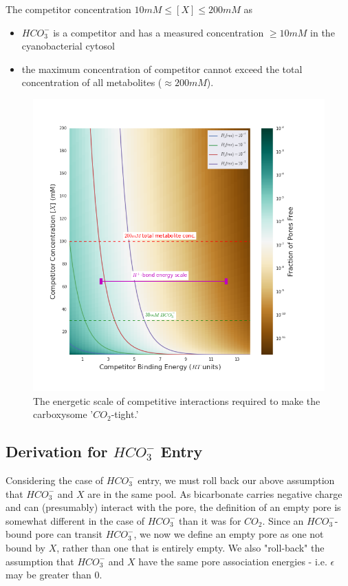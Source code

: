 \documentclass[10pt,a4paper]{article}
\begin{document}
The competitor concentration $10 mM \le [X] \le 200 mM$ as
\begin{itemize}
\item $HCO_3^-$ is a competitor and has a measured concentration $\ge 10 mM$ in the cyanobacterial cytosol
\item the maximum concentration of competitor cannot exceed the total concentration of all metabolites ($\approx 200 mM$).
\end{itemize}


\begin{figure}[ht]
\centering
\includegraphics[scale=0.6]{figures/competitive_pore_energy_v_conc.png} 
\caption{The energetic scale of competitive interactions required to make the carboxysome '$CO_2$-tight.'}
\label{fig1}
\end{figure}

\subsection{Derivation for $HCO_3^-$ Entry}

Considering the case of $HCO_3^-$ entry, we must roll back our above assumption that $HCO_3^-$ and $X$ are in the same pool. As bicarbonate carries negative charge and can (presumably) interact with the pore, the definition of an empty pore is somewhat different in the case of $HCO_3^-$ than it was for $CO_2$. Since an $HCO_3^-$-bound pore can transit $HCO_3^-$, we now we define an empty pore as one not bound by $X$, rather than one that is entirely empty. We also "roll-back" the assumption that $HCO_3^-$ and $X$ have the same pore association energies - i.e. $\epsilon$ may be greater than $0$.  
\end{document}
